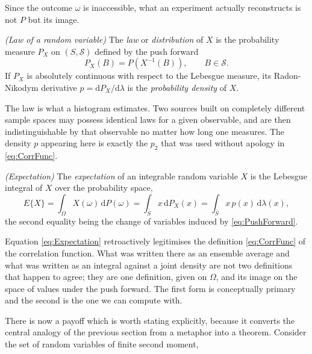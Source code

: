 		Since the outcome $\omega$ is inaccessible, what an experiment actually reconstructs is
		not $P$ but its image.

		\begin{myDef}
			\textit{(Law of a random variable)} The \emph{law} or \emph{distribution} of $X$
			is the probability measure $P_{X}$ on $(S,\mathcal{S})$ defined by the push forward
			\begin{equation}\label{eq:PushForward}
				P_{X}(B) = P\left(X^{-1}(B)\right), \qquad B\in\mathcal{S}.
			\end{equation}
			If $P_{X}$ is absolutely continuous with respect to the Lebesgue measure, its
			Radon-Nikodym derivative $p = \mathrm{d}P_{X}/\mathrm{d}\lambda$ is the
			\emph{probability density} of $X$.
		\end{myDef}

		The law is what a histogram estimates. Two sources built on completely different sample
		spaces may possess identical laws for a given observable, and are then indistinguishable
		by that observable no matter how long one measures. The density $p$ appearing here is
		exactly the $p_{2}$ that was used without apology in \eqref{eq:CorrFunc}.

		\begin{myDef}
			\textit{(Expectation)} The \emph{expectation} of an integrable random variable
			$X$ is the Lebesgue integral of $X$ over the probability space,
			\begin{equation}\label{eq:Expectation}
				E\{X\} = \int_{\Omega}X(\omega)\,\mathrm{d}P(\omega)
				= \int_{S}x\,\mathrm{d}P_{X}(x) = \int_{S}x\,p(x)\,\mathrm{d}\lambda(x),
			\end{equation}
			the second equality being the change of variables induced by \eqref{eq:PushForward}.
		\end{myDef}

		Equation \eqref{eq:Expectation} retroactively legitimises the definition
		\eqref{eq:CorrFunc} of the correlation function. What was written there as an ensemble
		average and what was written as an integral against a joint density are not two
		definitions that happen to agree; they are one definition, given on $\Omega$, and its
		image on the space of values under the push forward. The first form is conceptually
		primary and the second is the one we can compute with.

		There is now a payoff which is worth stating explicitly, because it converts the central
		analogy of the previous section from a metaphor into a theorem. Consider the set of
		random variables of finite second moment,

